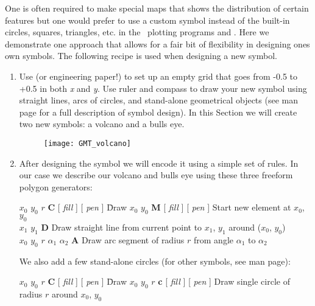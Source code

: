 One is often required to make special maps that shows the
distribution of certain features but one would prefer to
use a custom symbol instead of the built-in circles,
squares, triangles, etc. in the \GMT\ plotting programs
 and .  Here we demonstrate one
approach that allows for a fair bit of flexibility in
designing ones own symbols.  The following recipe is used
when designing a new symbol.
\begin{enumerate}
\item Use  (or
engineering paper!) to set up an empty grid that goes from
-0.5 to +0.5 in both \emph{x} and \emph{y}.  Use ruler and
compass to draw your new symbol using straight lines,
arcs of circles, and stand-alone geometrical objects (see  man page for
a full description of symbol design).  In this Section we will create two new symbols:
a volcano and a bulls eye.

\begin{figure}[ht]
   \centering\texttt{[image: GMT\_volcano]}
\end{figure}

\item After designing the symbol we will encode it using a
simple set of rules.  In our case we describe our volcano and bulls eye
using these three freeform polygon generators:

\begin{tabbing} 
$x_0$ $y_0$ $r$ \textbf{C} [ \emph{fill} ] [ \emph{pen} ] \=Draw \kill
$x_0$ $y_0$ \textbf{M} [ \emph{fill} ] [ \emph{pen} ] \> Start new element at $x_0$, $y_0$ \\ 
$x_1$ $y_1$ \textbf{D} \> Draw straight line from current point to $x_1$, $y_1$ around ($x_0$, $y_0$) \\ 
$x_0$ $y_0$ $r$ $\alpha_1$ $\alpha_2$ \textbf{A} \> Draw
arc segment of radius $r$ from angle $\alpha_1$ to $\alpha_2$
\end{tabbing} 

We also add a few stand-alone circles (for other symbols, see  man page):

\begin{tabbing} 
$x_0$ $y_0$ $r$ \textbf{C} [ \emph{fill} ] [ \emph{pen} ] \=Draw \kill
$x_0$ $y_0$ $r$ \textbf{c} [ \emph{fill} ] [ \emph{pen} ] \> Draw
single circle of radius $r$ around $x_0$, $y_0$ \\
\end{tabbing} 


\end{enumerate}
